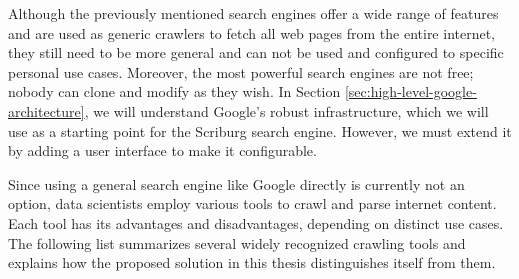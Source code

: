 Although the previously mentioned search engines offer a wide range of features and are used as generic crawlers to fetch all web pages from the entire internet, they still need to be more general and can not be used and configured to specific personal use cases. Moreover, the most powerful search engines are not free; nobody can clone and modify as they wish. In Section \ref{sec:high-level-google-architecture}, we will understand Google's robust infrastructure, which we will use as a starting point for the Scriburg search engine. However, we must extend it by adding a user interface to make it configurable.

Since using a general search engine like Google directly is currently not an option, data scientists employ various tools to crawl and parse internet content. Each tool has its advantages and disadvantages, depending on distinct use cases. The following list summarizes several widely recognized crawling tools and explains how the proposed solution in this thesis distinguishes itself from them.


